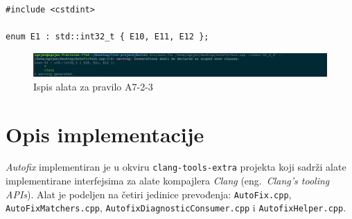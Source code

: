 \documentclass[12pt,oneside]{memoir}
\begin{document}
\begin{lstlisting}[style=customc, caption={Primer koda koji nije napisan u skladu sa pravilom A7-2-3.}, label=lst:label16]
#include <cstdint>

enum E1 : std::int32_t { E10, E11, E12 };

\end{lstlisting}


\begin{figure}[!h]
\begin{center}
\includegraphics[scale=0.3]{A7-2-3.png}
\end{center}
\caption{Ispis alata za pravilo A7-2-3}
\label{fig:A7-2-3}
\end{figure}

\section{Opis implementacije}

\textit{Autofix} implementiran je u okviru \texttt{clang-tools-extra} projekta koji sadr\v{z}i alate implementirane interfejsima za alate kompajlera \textit{Clang} (eng.~\textit{Clang’s tooling APIs}).
Alat je podeljen na \v{c}etiri jedinice prevođenja: \texttt{AutoFix.cpp}, \texttt{AutoFixMatchers.cpp}, \texttt{AutofixDiagnosticConsumer.cpp} i \texttt{AutofixHelper.cpp}.
\end{document}
